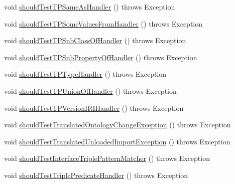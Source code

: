 \begin{DoxyCompactItemize}
\item 
void \hyperlink{classorg_1_1semanticweb_1_1owlapi_1_1contract_1_1_contract_rdfxml_parser_test_afeafca0db70d2be972995d21b718c895}{should\-Test\-T\-P\-Same\-As\-Handler} ()  throws Exception 
\item 
void \hyperlink{classorg_1_1semanticweb_1_1owlapi_1_1contract_1_1_contract_rdfxml_parser_test_aa10f753c7a7cec465913a35c6f45adb8}{should\-Test\-T\-P\-Some\-Values\-From\-Handler} ()  throws Exception 
\item 
void \hyperlink{classorg_1_1semanticweb_1_1owlapi_1_1contract_1_1_contract_rdfxml_parser_test_a7cc404bb32d4eb878573f2b457adc0fd}{should\-Test\-T\-P\-Sub\-Class\-Of\-Handler} ()  throws Exception 
\item 
void \hyperlink{classorg_1_1semanticweb_1_1owlapi_1_1contract_1_1_contract_rdfxml_parser_test_a4021132324be4903d96ab9b66b7405a9}{should\-Test\-T\-P\-Sub\-Property\-Of\-Handler} ()  throws Exception 
\item 
void \hyperlink{classorg_1_1semanticweb_1_1owlapi_1_1contract_1_1_contract_rdfxml_parser_test_a0705710b418095f4f931d6115f4c70dc}{should\-Test\-T\-P\-Type\-Handler} ()  throws Exception 
\item 
void \hyperlink{classorg_1_1semanticweb_1_1owlapi_1_1contract_1_1_contract_rdfxml_parser_test_afb9b42818a9a368fe1068d0d62125324}{should\-Test\-T\-P\-Union\-Of\-Handler} ()  throws Exception 
\item 
void \hyperlink{classorg_1_1semanticweb_1_1owlapi_1_1contract_1_1_contract_rdfxml_parser_test_adcd8b5e2df26a394a0aa776c5f761fd7}{should\-Test\-T\-P\-Version\-I\-R\-I\-Handler} ()  throws Exception 
\item 
void \hyperlink{classorg_1_1semanticweb_1_1owlapi_1_1contract_1_1_contract_rdfxml_parser_test_a8f53c982a06010623923c864adb8ace1}{should\-Test\-Translated\-Ontology\-Change\-Exception} ()  throws Exception 
\item 
void \hyperlink{classorg_1_1semanticweb_1_1owlapi_1_1contract_1_1_contract_rdfxml_parser_test_ab3cb46112ca375c6256021f164df30df}{should\-Test\-Translated\-Unloaded\-Import\-Exception} ()  throws Exception 
\item 
void \hyperlink{classorg_1_1semanticweb_1_1owlapi_1_1contract_1_1_contract_rdfxml_parser_test_ad710ee800cde5b0dfc5d6a355cebc2c4}{should\-Test\-Interface\-Triple\-Pattern\-Matcher} ()  throws Exception 
\item 
void \hyperlink{classorg_1_1semanticweb_1_1owlapi_1_1contract_1_1_contract_rdfxml_parser_test_aabd588119d503f1c63dc27f62cbb866f}{should\-Test\-Triple\-Predicate\-Handler} ()  throws Exception 

\end{DoxyCompactItemize}

